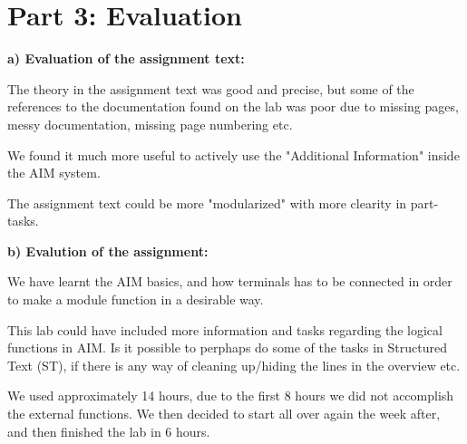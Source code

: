
\section{Part 3: Evaluation}

\textbf{a) Evaluation of the assignment text:}

The theory in the assignment text was good and precise, but some of the references to the documentation found on the lab was poor due to missing pages, messy documentation, missing page numbering etc.

We found it much more useful to actively use the "Additional Information" inside the AIM system.

The assignment text could be more "modularized" with more clearity in part-tasks.

\textbf{b) Evalution of the assignment:}

We have learnt the AIM basics, and how terminals has to be connected in order to make a module function in a desirable way.

This lab could have included more information and tasks regarding the logical functions in AIM. Is it possible to perphaps do some of the tasks in Structured Text (ST), if there is any way of cleaning up/hiding the lines in the overview etc.


We used approximately 14 hours, due to the first 8 hours we did not accomplish the external functions. We then decided to start all over again the week after, and then finished the lab in 6 hours.



